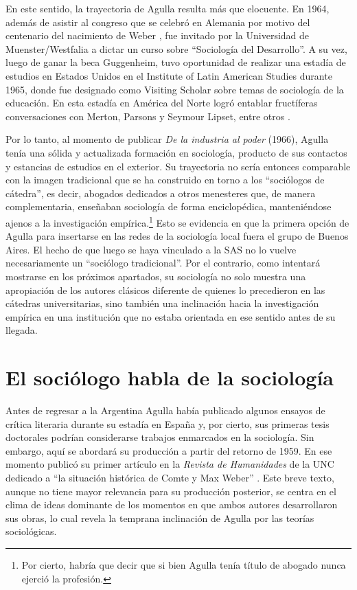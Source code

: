 En este sentido, la trayectoria de Agulla resulta más que elocuente. En 1964, además de asistir al congreso que se celebró en Alemania por motivo del centenario del nacimiento de Weber \parencite{1635-AGULLA1964}, fue invitado por la Universidad de Muenster/Westfalia a dictar un curso sobre \enquote{Sociología del Desarrollo}. A su vez, luego de ganar la beca Guggenheim, tuvo oportunidad de realizar una estadía de estudios en Estados Unidos en el Institute of Latin American Studies durante 1965, donde fue designado como Visiting Scholar sobre temas de sociología de la educación. En esta estadía en América del Norte logró entablar fructíferas conversaciones con Merton, Parsons y Seymour Lipset, entre otros \parencite{1634-AGULLA1997}.

Por lo tanto, al momento de publicar \emph{De la industria al poder} (1966), Agulla tenía una sólida y actualizada formación en sociología, producto de sus contactos y estancias de estudios en el exterior. Su trayectoria no sería entonces comparable con la imagen tradicional que se ha construido en torno a los \enquote{sociólogos de cátedra}, es decir, abogados dedicados a otros menesteres que, de manera complementaria, enseñaban sociología de forma enciclopédica, manteniéndose ajenos a la investigación empírica.\footnote{Por cierto, habría que decir que si bien Agulla tenía título de abogado nunca ejerció la profesión.} Esto se evidencia en que la primera opción de Agulla para insertarse en las redes de la sociología local fuera el grupo de Buenos Aires. El hecho de que luego se haya vinculado a la SAS no lo vuelve necesariamente un \enquote{sociólogo tradicional}. Por el contrario, como intentará mostrarse en los próximos apartados, su sociología no solo muestra una apropiación de los autores clásicos diferente de quienes lo precedieron en las cátedras universitarias, sino también una inclinación hacia la investigación empírica en una institución que no estaba orientada en ese sentido antes de su llegada.

\section{El sociólogo habla de la sociología}

Antes de regresar a la Argentina Agulla había publicado algunos ensayos de crítica literaria durante su estadía en España y, por cierto, sus primeras tesis doctorales podrían considerarse trabajos enmarcados en la sociología. Sin embargo, aquí se abordará su producción a partir del retorno de 1959. En ese momento publicó su primer artículo en la \emph{Revista de Humanidades} de la UNC dedicado a \enquote{la situación histórica de Comte y Max Weber} \parencite{1636-AGULLA1959}. Este breve texto, aunque no tiene mayor relevancia para su producción posterior, se centra en el clima de ideas dominante de los momentos en que ambos autores desarrollaron sus obras, lo cual revela la temprana inclinación de Agulla por las teorías sociológicas.

